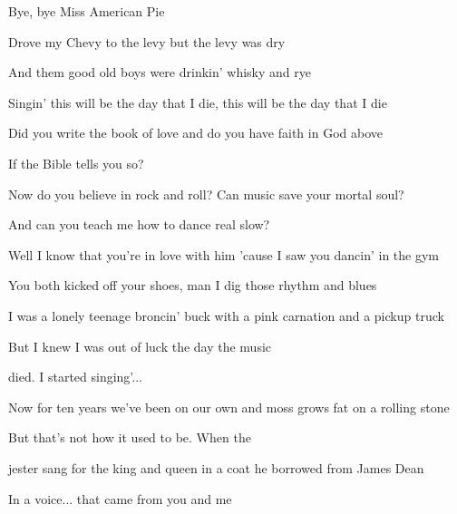 \begin{song}
\bigskip

\begin{chorusbox}{\Chorus}
Bye, bye Miss American Pie \par
Drove my Chevy to the levy but the levy was dry \par
And them good old boys were drinkin' whisky and rye \par
Singin' this will be the day that I die, this will be the day that I die \par
\end{chorusbox}

\bigskip

 \par
{} Did you write the book of love and do you have faith in God above \par
{} If the Bible tells you so? \par
Now do you believe in rock and roll? Can music save your mortal soul? \par
And  can you teach me  how to dance real slow? \par

\bigskip

Well I know that you're in love with him 'cause I saw you dancin' in the gym \par
You both kicked off your shoes, man I dig those rhythm and blues \par
I was a lonely teenage broncin' buck with a pink carnation and a pickup truck \par
But I knew I was out of luck the day the music \par
{}died.   I started singing'... \par

\bigskip

\Chorus \par

\bigskip

Now for ten years we've been on our own and moss grows fat on a rolling stone \par
But that's not how it used to be. When the \par
{}jester sang for the king and queen in a coat he borrowed from James Dean \par
In a voice... that came from you and me \par


\end{song}
